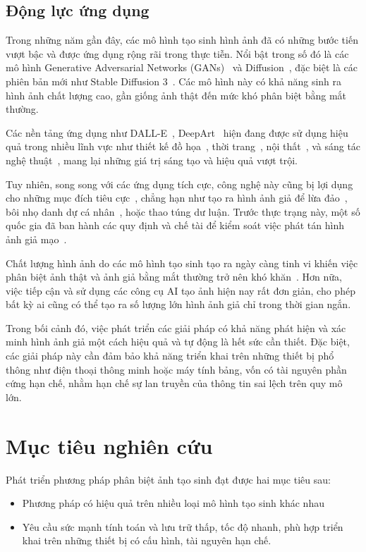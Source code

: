 \subsection{Động lực ứng dụng}

Trong những năm gần đây, các mô hình tạo sinh hình ảnh đã có những bước tiến vượt bậc và được ứng dụng rộng rãi trong thực tiễn. Nổi bật trong số đó là các mô hình Generative Adversarial Networks (GANs)~\cite{Goodfellow2014GenerativeAN} và Diffusion~\cite{Ho2020DenoisingDP}, đặc biệt là các phiên bản mới như Stable Diffusion 3~\cite{Esser2024ScalingRF}. Các mô hình này có khả năng sinh ra hình ảnh chất lượng cao, gần giống ảnh thật đến mức khó phân biệt bằng mắt thường.

Các nền tảng ứng dụng như DALL-E~\cite{dalle2}, DeepArt~\cite{deepart} hiện đang được sử dụng hiệu quả trong nhiều lĩnh vực như thiết kế đồ họa~\cite{CasteleiroPitrez2024GenerativeAI,Shin2024CanPM}, thời trang~\cite{8769486}, nội thất~\cite{Chen2020ApplicationOA}, và sáng tác nghệ thuật~\cite{Ai_won_an_art_contest}, mang lại những giá trị sáng tạo và hiệu quả vượt trội.

Tuy nhiên, song song với các ứng dụng tích cực, công nghệ này cũng bị lợi dụng cho những mục đích tiêu cực~\cite{DBLP-abs-2107-10139}, chẳng hạn như tạo ra hình ảnh giả để lừa đảo~\cite{Ai_chief_financial_officer}, bôi nhọ danh dự cá nhân~\cite{VirginiaDeepfake}, hoặc thao túng dư luận. Trước thực trạng này, một số quốc gia đã ban hành các quy định và chế tài để kiểm soát việc phát tán hình ảnh giả mạo~\cite{CaliforniaDeepfakes}.

Chất lượng hình ảnh do các mô hình tạo sinh tạo ra ngày càng tinh vi khiến việc phân biệt ảnh thật và ảnh giả bằng mắt thường trở nên khó khăn~\cite{spottingai}. Hơn nữa, việc tiếp cận và sử dụng các công cụ AI tạo ảnh hiện nay rất đơn giản, cho phép bất kỳ ai cũng có thể tạo ra số lượng lớn hình ảnh giả chỉ trong thời gian ngắn.

Trong bối cảnh đó, việc phát triển các giải pháp có khả năng phát hiện và xác minh hình ảnh giả một cách hiệu quả và tự động là hết sức cần thiết. Đặc biệt, các giải pháp này cần đảm bảo khả năng triển khai trên những thiết bị phổ thông như điện thoại thông minh hoặc máy tính bảng, vốn có tài nguyên phần cứng hạn chế, nhằm hạn chế sự lan truyền của thông tin sai lệch trên quy mô lớn.


\section{Mục tiêu nghiên cứu}
Phát triển phương pháp phân biệt ảnh tạo sinh đạt được hai mục tiêu sau:
\begin{itemize}
	\item Phương pháp có hiệu quả trên nhiều loại mô hình tạo sinh khác nhau
	\item Yêu cầu sức mạnh tính toán và lưu trữ thấp, tốc độ nhanh, phù hợp triển khai trên những thiết bị có cấu hình, tài nguyên hạn chế.
\end{itemize}

